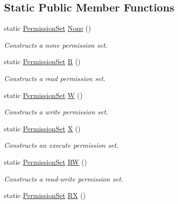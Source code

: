 \subsection*{Static Public Member Functions}
\begin{DoxyCompactItemize}
\item 
static \hyperlink{classlibrary_1_1core_1_1fs_1_1_permission_set}{Permission\+Set} \hyperlink{classlibrary_1_1core_1_1fs_1_1_permission_set_af590f297c53ba55474f8d5b78bc45b62}{None} ()
\begin{DoxyCompactList}\small\item\em Constructs a none permission set. \end{DoxyCompactList}\item 
static \hyperlink{classlibrary_1_1core_1_1fs_1_1_permission_set}{Permission\+Set} \hyperlink{classlibrary_1_1core_1_1fs_1_1_permission_set_a48d447273c118d6a7c81aebb505189c6}{R} ()
\begin{DoxyCompactList}\small\item\em Constructs a read permission set. \end{DoxyCompactList}\item 
static \hyperlink{classlibrary_1_1core_1_1fs_1_1_permission_set}{Permission\+Set} \hyperlink{classlibrary_1_1core_1_1fs_1_1_permission_set_a7046fb1ae54d0308161a44eaf01b03e1}{W} ()
\begin{DoxyCompactList}\small\item\em Constructs a write permission set. \end{DoxyCompactList}\item 
static \hyperlink{classlibrary_1_1core_1_1fs_1_1_permission_set}{Permission\+Set} \hyperlink{classlibrary_1_1core_1_1fs_1_1_permission_set_a7f4717643d0b80b0b98104c357b3322f}{X} ()
\begin{DoxyCompactList}\small\item\em Constructs an execute permission set. \end{DoxyCompactList}\item 
static \hyperlink{classlibrary_1_1core_1_1fs_1_1_permission_set}{Permission\+Set} \hyperlink{classlibrary_1_1core_1_1fs_1_1_permission_set_a9722204cdc11a0171e1a115d449a134b}{RW} ()
\begin{DoxyCompactList}\small\item\em Constructs a read-\/write permission set. \end{DoxyCompactList}\item 
static \hyperlink{classlibrary_1_1core_1_1fs_1_1_permission_set}{Permission\+Set} \hyperlink{classlibrary_1_1core_1_1fs_1_1_permission_set_ab632d79f1b8b8f4577bc06fa622b1c09}{RX} ()

\end{DoxyCompactItemize}
